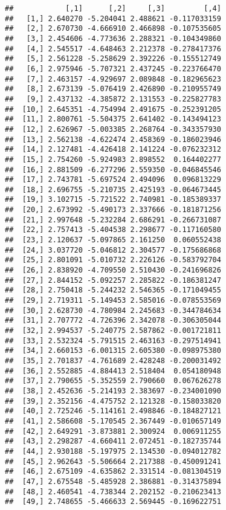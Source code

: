 \documentclass[
]{article}
\begin{document}
\begin{verbatim}
##            [,1]      [,2]     [,3]         [,4]
##   [1,] 2.640270 -5.204041 2.488621 -0.117033159
##   [2,] 2.670730 -4.666910 2.466898 -0.107535605
##   [3,] 2.454606 -4.773636 2.288321 -0.104349860
##   [4,] 2.545517 -4.648463 2.212378 -0.278417376
##   [5,] 2.561228 -5.258629 2.392226 -0.155512749
##   [6,] 2.975946 -5.707321 2.437245 -0.223766470
##   [7,] 2.463157 -4.929697 2.089848 -0.182965623
##   [8,] 2.673139 -5.076419 2.426890 -0.210955749
##   [9,] 2.437132 -4.385872 2.131553 -0.225827783
##  [10,] 2.645351 -4.754994 2.491675 -0.252391205
##  [11,] 2.800761 -5.504375 2.641402 -0.143494123
##  [12,] 2.626967 -5.003385 2.268764 -0.343357930
##  [13,] 2.562138 -4.622474 2.458369 -0.186023946
##  [14,] 2.127481 -4.426418 2.141224 -0.076232312
##  [15,] 2.754260 -5.924983 2.898552  0.164402277
##  [16,] 2.881509 -6.277296 2.559350 -0.046845546
##  [17,] 2.743781 -5.697524 2.494096  0.096813229
##  [18,] 2.696755 -5.210735 2.425193 -0.064673445
##  [19,] 3.102715 -5.721522 2.740981 -0.185389337
##  [20,] 2.673992 -5.490173 2.337666 -0.181871256
##  [21,] 2.997648 -5.232284 2.686291 -0.266731087
##  [22,] 2.757413 -5.404538 2.298677 -0.117160580
##  [23,] 2.120637 -5.097865 2.161250  0.060552438
##  [24,] 3.037720 -5.046812 2.304577 -0.175686868
##  [25,] 2.801091 -5.010732 2.226126 -0.583792704
##  [26,] 2.838920 -4.709550 2.510430 -0.241696826
##  [27,] 2.844152 -5.092257 2.285822 -0.186381247
##  [28,] 2.750418 -5.244232 2.546365 -0.171049455
##  [29,] 2.719311 -5.149453 2.585016 -0.078553569
##  [30,] 2.628730 -4.780984 2.245683 -0.344784634
##  [31,] 2.707772 -4.726396 2.342078 -0.306305044
##  [32,] 2.994537 -5.240775 2.587862 -0.001721811
##  [33,] 2.532324 -5.791515 2.463163 -0.297514941
##  [34,] 2.660153 -6.001315 2.605380 -0.098975380
##  [35,] 2.701837 -4.761689 2.428248 -0.200031492
##  [36,] 2.552885 -4.884413 2.518404  0.054180948
##  [37,] 2.790655 -5.352559 2.790660  0.067626278
##  [38,] 2.452636 -5.214193 2.383697 -0.234001090
##  [39,] 2.352156 -4.475752 2.121328 -0.158033820
##  [40,] 2.725246 -5.114161 2.498846 -0.184827121
##  [41,] 2.586608 -5.170545 2.367449 -0.010657149
##  [42,] 2.649291 -3.873881 2.300924  0.006911255
##  [43,] 2.298287 -4.660411 2.072451 -0.182735744
##  [44,] 2.930188 -5.197975 2.134530 -0.094012782
##  [45,] 2.962643 -5.506664 2.217388 -0.450091241
##  [46,] 2.675109 -4.635862 2.331514 -0.081304519
##  [47,] 2.675548 -5.485928 2.386881 -0.314375894
##  [48,] 2.460541 -4.738344 2.202152 -0.210623413
##  [49,] 2.748655 -5.466633 2.569445 -0.169622751

\end{verbatim}
\end{document}
